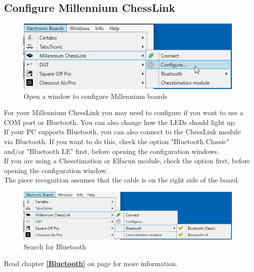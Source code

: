 \documentclass[11pt,a4paper]{article}
\begin{document}
\subsection{Configure Millennium ChessLink} \label{ConfigureChessLink}
\begin{figure}[H]
	\centering
	\includegraphics[scale=1.0]{MillenniumChessLink1.png}
	\caption{Open a window to configure Millennium boards }
	\label{fig:MillenniumChessLink1}
\end{figure}

For your Millennium ChessLink you may need to configure if you want to use a COM port or Bluetooth. You can also change how the LEDs should light up.\\
If your PC supports Bluetooth, you can also connect to the ChessLink module via Bluetooth. If you want to do this, check the option "Bluetooth Classic" and/or "Bluetooth LE" first, before opening the configuration windows.\\
If you are using a Chesstimation or Elfacun module, check the option first, before opening the configuration window.\\
The piece recognition assumes that the cable is on the right side of the board.

\begin{figure}[H]
	\centering
	\includegraphics[scale=0.7]{MillenniumChessLink9.png}
	\caption{Search for Bluetooth}
	\label{fig:MillenniumChessLink9}
\end{figure}
Read chapter \textbf{\ref{Bluetooth}  } on page \pageref{Bluetooth} for more information.
\end{document}
